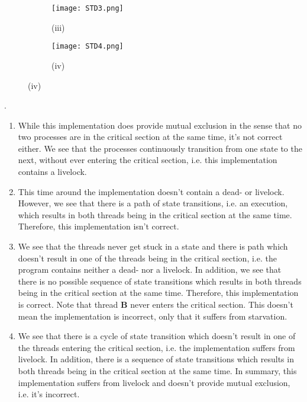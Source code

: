 \documentclass[main]{subfiles}
\begin{document}
\begin{ExerciseList}
            \begin{figure}[H]
                \centering
                \begin{subfigure}{.5\textwidth}
                    \centering
                    \texttt{[image: STD3.png]}
                    \captionsetup{labelformat=empty}
                    \caption{(iii)}
                \end{subfigure}%
                \begin{subfigure}{.5\textwidth}
                    \centering
                    \texttt{[image: STD4.png]}
                    \captionsetup{labelformat=empty}
                    \caption{(iv)}
                \end{subfigure}
            \end{figure}
            
        \Answer[ref={MEI}].\quad \\
        \begin{enumerate}[label=(\roman*)]
            \item \quad While this implementation does provide mutual exclusion in the sense that no two processes are in the critical section at the same time, it's not correct either. We see that the processes continuously transition from one state to the next, without ever entering the critical section, i.e. this implementation contains a livelock.
            \item \quad This time around the implementation doesn't contain a dead- or livelock. However, we see that there is a path of state transitions, i.e. an execution, which results in both threads being in the critical section at the same time. Therefore, this implementation isn't correct.
            \item \quad We see that the threads never get stuck in a state and there is path which doesn't result in one of the threads being in the critical section, i.e. the program contains neither a dead- nor a livelock. In addition, we see that there is no possible sequence of state transitions which results in both threads being in the critical section at the same time. Therefore, this implementation is correct. Note that thread \textbf{B} never enters the critical section. This doesn't mean the implementation is incorrect, only that it suffers from starvation.
            \item \quad We see that there is a cycle of state transition which doesn't result in one of the threads entering the critical section, i.e. the implementation suffers from livelock. In addition, there is a sequence of state transitions which results in both threads being in the critical section at the same time. In summary, this implementation suffers from livelock and doesn't provide mutual exclusion, i.e. it's incorrect.
        \end{enumerate}
        

\end{ExerciseList}
\end{document}
